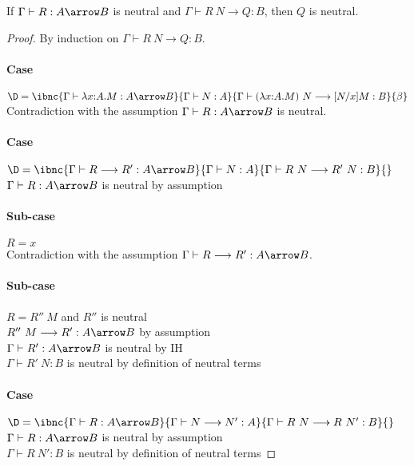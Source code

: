 \documentclass{article}
\newcommand{\red}{\longrightarrow}
\begin{document}
\begin{lemma}\label{lm:neu-step}
If $\Gamma \vdash R : A \arrow B$ is neutral and $\Gamma \vdash R~N \red Q : B$, then $Q$ is neutral.
\end{lemma}
\begin{proof}
By induction on $\Gamma \vdash R~N \red Q : B$.

\paragraph{Case}
$\D = \ibnc {\Gamma \vdash \lambda x{:}A.M : A \arrow B}
	          {\Gamma \vdash  N : A}
            {\Gamma \vdash (\lambda x{:}A.M)~N  \red [N/x]M : B }{\beta}$
\\
Contradiction with the assumption $\Gamma \vdash R : A \arrow B$ is neutral.

\paragraph{Case}
$\D = \ibnc {\Gamma \vdash R \red R' : A \arrow B}
	          {\Gamma \vdash N : A}
            {\Gamma \vdash R~N \red R'~N : B}{}$
\\
$\Gamma \vdash R : A \arrow B$ is neutral \hfill by assumption

\paragraph{Sub-case} $R = x$ \\
Contradiction with the assumption $\Gamma \vdash R \red R' : A \arrow B$.

\paragraph{Sub-case} $R = R''~M$ and $R''$ is neutral \\
$R''~M \red R' : A \arrow B$ \hfill by assumption \\
$\Gamma \vdash R' : A \arrow B$ is neutral \hfill by IH \\
$\Gamma \vdash R'~N : B$ is neutral \hfill by definition of neutral terms

\paragraph{Case}
$\D = \ibnc {\Gamma \vdash R : A \arrow B}
	          {\Gamma \vdash N \red N' : A}
            {\Gamma \vdash R~N \red R~N' : B}{}$
\\
$\Gamma \vdash R : A \arrow B$ is neutral \hfill by assumption \\
$\Gamma \vdash R~N' : B$ is neutral \hfill by definition of neutral terms

\end{proof}
\end{document}
